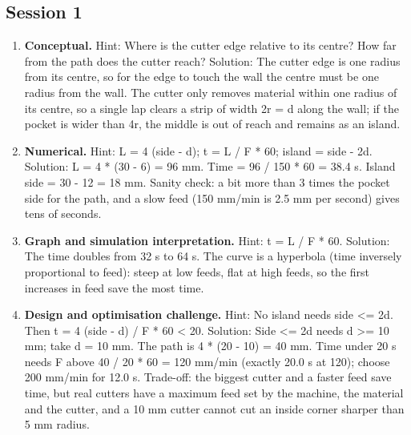 \documentclass[11pt,a4paper]{article}
\begin{document}
\subsection*{Session 1}
\begin{enumerate}[nosep]
\item \textbf{Conceptual.} Hint: Where is the cutter edge relative to its centre? How far from the path does the cutter reach? Solution: The cutter edge is one radius from its centre, so for the edge to touch the wall the centre must be one radius from the wall. The cutter only removes material within one radius of its centre, so a single lap clears a strip of width 2r = d along the wall; if the pocket is wider than 4r, the middle is out of reach and remains as an island.
\item \textbf{Numerical.} Hint: L = 4 (side - d); t = L / F * 60; island = side - 2d. Solution: L = 4 * (30 - 6) = 96 mm. Time = 96 / 150 * 60 = 38.4 s. Island side = 30 - 12 = 18 mm. Sanity check: a bit more than 3 times the pocket side for the path, and a slow feed (150 mm/min is 2.5 mm per second) gives tens of seconds.
\item \textbf{Graph and simulation interpretation.} Hint: t = L / F * 60. Solution: The time doubles from 32 s to 64 s. The curve is a hyperbola (time inversely proportional to feed): steep at low feeds, flat at high feeds, so the first increases in feed save the most time.
\item \textbf{Design and optimisation challenge.} Hint: No island needs side \textless{}= 2d. Then t = 4 (side - d) / F * 60 \textless{} 20. Solution: Side \textless{}= 2d needs d \textgreater{}= 10 mm; take d = 10 mm. The path is 4 * (20 - 10) = 40 mm. Time under 20 s needs F above 40 / 20 * 60 = 120 mm/min (exactly 20.0 s at 120); choose 200 mm/min for 12.0 s. Trade-off: the biggest cutter and a faster feed save time, but real cutters have a maximum feed set by the machine, the material and the cutter, and a 10 mm cutter cannot cut an inside corner sharper than 5 mm radius.
\end{enumerate}
\end{document}
